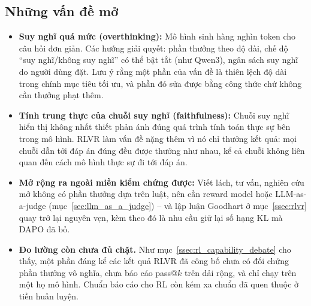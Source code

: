 \subsection{Những vấn đề mở}
\label{ssec:reasoning_open_problems}
\begin{itemize}
	\item \textbf{Suy nghĩ quá mức (overthinking):} Mô hình sinh hàng nghìn token cho câu hỏi đơn giản. Các hướng giải quyết: phần thưởng theo độ dài, chế độ ``suy nghĩ/không suy nghĩ'' có thể bật tắt (như Qwen3), ngân sách suy nghĩ do người dùng đặt. Lưu ý rằng một phần của vấn đề là thiên lệch độ dài trong chính mục tiêu tối ưu, và phần đó sửa được bằng công thức chứ không cần thưởng phạt thêm.
	\item \textbf{Tính trung thực của chuỗi suy nghĩ (faithfulness):} Chuỗi suy nghĩ hiển thị không nhất thiết phản ánh đúng quá trình tính toán thực sự bên trong mô hình. RLVR làm vấn đề nặng thêm vì nó chỉ thưởng kết quả: mọi chuỗi dẫn tới đáp án đúng đều được thưởng như nhau, kể cả chuỗi không liên quan đến cách mô hình thực sự đi tới đáp án.
	\item \textbf{Mở rộng ra ngoài miền kiểm chứng được:} Viết lách, tư vấn, nghiên cứu mở không có phần thưởng dựa trên luật, nên cần reward model hoặc LLM-as-a-judge (mục~\ref{sec:llm_as_a_judge}) -- và lập luận Goodhart ở mục~\ref{ssec:rlvr} quay trở lại nguyên vẹn, kèm theo đó là nhu cầu giữ lại số hạng KL mà DAPO đã bỏ.
	\item \textbf{Đo lường còn chưa đủ chặt.} Như mục~\ref{ssec:rl_capability_debate} cho thấy, một phần đáng kể các kết quả RLVR đã công bố chưa có đối chứng phần thưởng vô nghĩa, chưa báo cáo pass@$k$ trên dải rộng, và chỉ chạy trên một họ mô hình. Chuẩn báo cáo cho RL còn kém xa chuẩn đã quen thuộc ở tiền huấn luyện.
\end{itemize}
